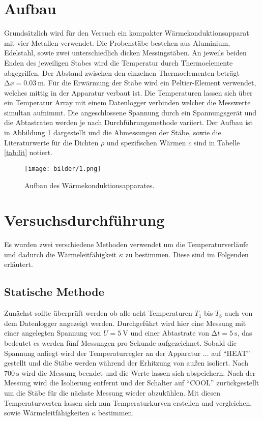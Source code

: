 \section{Aufbau}
Grundsätzlich wird für den Versuch ein kompakter Wärmekonduktionsapparat mit vier Metallen verwendet.
Die Probenstäbe bestehen aus Aluminium, Edelstahl, sowie zwei unterschiedlich dicken Messingstäben. An jeweils beiden Enden des jeweiligen Stabes wird die Temperatur durch Thermoelemente abgegriffen. Der Abstand zwischen den einzelnen Thermoelementen beträgt $\increment x = \SI{0.03}{\meter}$. Für die Erwärmung der Stäbe wird ein Peltier-Element verwendet, welches mittig in der Apparatur verbaut ist. Die Temperaturen lassen sich über ein Temperatur Array mit einem Datenlogger verbinden welcher die Messwerte simultan aufnimmt. Die angeschlossene Spannung durch ein Spannungsgerät und die Abtastraten werden je nach Durchführungsmethode variiert. Der Aufbau ist in Abbildung \ref{fig:1} dargestellt und die Abmessungen der Stäbe, sowie die Literaturwerte für die Dichten $\rho$ und spezifischen Wärmen $c$ sind in Tabelle \ref{tab:lit} notiert.

\begin{figure}
    \centering
    \texttt{[image: bilder/1.png]}
    \caption{Aufbau des Wärmekonduktionsapparates. \cite{skript}} 
    \label{fig:1}
\end{figure}
\section{Versuchsdurchführung}
Es wurden zwei verschiedene Methoden verwendet um die Temperaturverläufe und dadurch die Wärmeleitfähigkeit $\kappa$ zu bestimmen. Diese sind im Folgenden erläutert.

\subsection{Statische Methode}
Zunächst sollte überprüft werden ob alle acht Temperaturen $T_{1}$ bis $T_{8}$ auch von dem Datenlogger angezeigt werden. Durchgeführt wird hier eine Messung mit einer angelegten Spannung von $U = \SI{5}{\volt}$ und einer Abtastrate von $\increment t = \SI{5}{\second}$, das bedeutet es werden fünf Messungen pro Sekunde aufgezeichnet. Sobald die Spannung anliegt wird der Temperaturregler an der Apparatur ... auf \enquote{HEAT} gestellt und die Stäbe werden während der Erhitzung von außen isoliert. Nach $\SI{700}{\second}$ wird die Messung beendet und die Werte lassen sich abspeichern.
Nach der Messung wird die Isolierung entfernt und der Schalter auf \enquote{COOL} zurückgestellt um die Stäbe für die nächste Messung wieder abzukühlen.
Mit diesen Temperaturwerten lassen sich nun Temperaturkurven erstellen und vergleichen, sowie Wärmeleitfähigkeiten $\kappa$ bestimmen.

